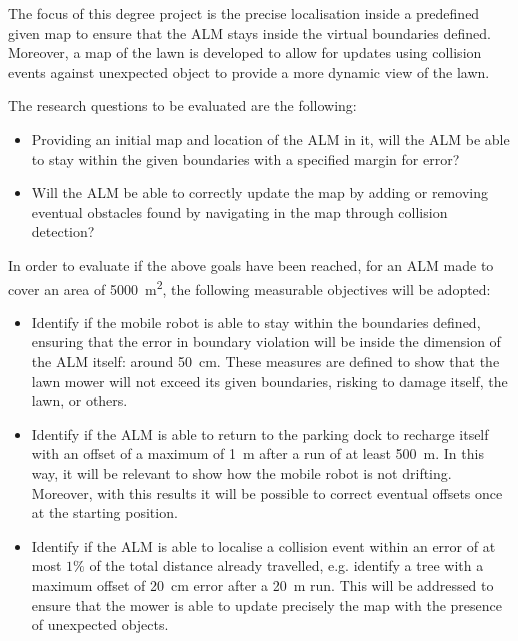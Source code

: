 The focus of this degree project is the precise localisation inside a predefined given map to ensure that the \gls{ALM} stays inside the virtual boundaries defined.
Moreover, a map of the lawn is developed to allow for updates using collision events against unexpected object to provide a more dynamic view of the lawn.

The research questions to be evaluated are the following:
\begin{itemize}
    \item Providing an initial map and location of the \gls{ALM} in it, will the \gls{ALM} be able to stay within the given boundaries with a specified margin for error?
    \item Will the \gls{ALM} be able to correctly update the map by adding or removing eventual obstacles found by navigating in the map through collision detection?
\end{itemize}

In order to evaluate if the above goals have been reached, for an \gls{ALM} made to cover an area of \SI{5000}{\meter\squared}, the following measurable objectives will be adopted:
\begin{itemize}
    \item Identify if the mobile robot is able to stay within the boundaries defined, ensuring that the error in boundary violation will be inside the dimension of the \gls{ALM} itself: around \SI{50}{\cm}.
    These measures are defined to show that the lawn mower will not exceed its given boundaries, risking to damage itself, the lawn, or others.
    \item Identify if the \gls{ALM} is able to return to the parking dock to recharge itself with an offset of a maximum of \SI{1}{\m} after a run of at least \SI{500}{\m}. In this way, it will be relevant to show how the mobile robot is not drifting.
    Moreover, with this results it will be possible to correct eventual offsets once at the starting position.
    \item Identify if the \gls{ALM} is able to localise a collision event within an error of at most $1\%$ of the total distance already travelled, e.g. identify a tree with a maximum offset of \SI{20}{\cm} error after a \SI{20}{\m} run.
    This will be addressed to ensure that the mower is able to update precisely the map with the presence of unexpected objects.
\end{itemize}



